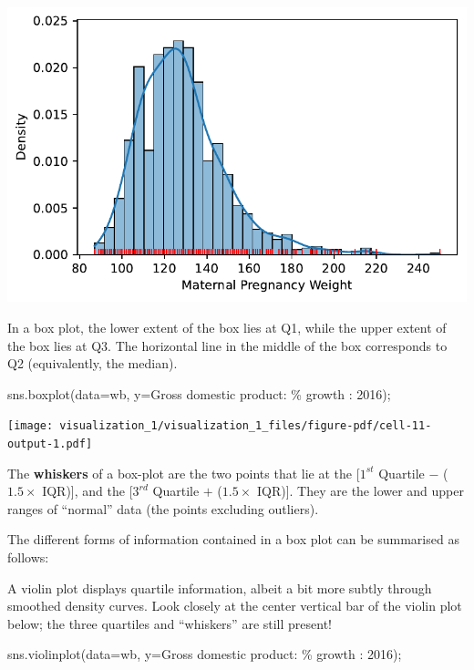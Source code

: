 \documentclass[
  letterpaper,
  DIV=11,
  numbers=noendperiod]{scrreprt}
\newenvironment{Shaded}{\begin{snugshade}}{\end{snugshade}}
\newcommand{\NormalTok}[1]{\textcolor[rgb]{0.00,0.23,0.31}{#1}}
\newcommand{\OperatorTok}[1]{\textcolor[rgb]{0.37,0.37,0.37}{#1}}
\newcommand{\SpecialCharTok}[1]{\textcolor[rgb]{0.37,0.37,0.37}{#1}}
\newcommand{\StringTok}[1]{\textcolor[rgb]{0.13,0.47,0.30}{#1}}
\begin{document}
\includegraphics{visualization_1/visualization_1_files/figure-pdf/cell-10-output-1.pdf}

In a box plot, the lower extent of the box lies at Q1, while the upper
extent of the box lies at Q3. The horizontal line in the middle of the
box corresponds to Q2 (equivalently, the median).

\begin{Shaded}
\begin{Highlighting}[]
\NormalTok{sns.boxplot(data}\OperatorTok{=}\NormalTok{wb, y}\OperatorTok{=}\StringTok{\textquotesingle{}Gross domestic product: }\SpecialCharTok{\% g}\StringTok{rowth : 2016\textquotesingle{}}\NormalTok{)}\OperatorTok{;}
\end{Highlighting}
\end{Shaded}

\texttt{[image: visualization\_1/visualization\_1\_files/figure-pdf/cell-11-output-1.pdf]}

The \textbf{whiskers} of a box-plot are the two points that lie at the
{[}\(1^{st}\) Quartile \(-\) (\(1.5\times\) IQR){]}, and the
{[}\(3^{rd}\) Quartile \(+\) (\(1.5\times\) IQR){]}. They are the lower
and upper ranges of ``normal'' data (the points excluding outliers).

The different forms of information contained in a box plot can be
summarised as follows:

A violin plot displays quartile information, albeit a bit more subtly
through smoothed density curves. Look closely at the center vertical bar
of the violin plot below; the three quartiles and ``whiskers'' are still
present!

\begin{Shaded}
\begin{Highlighting}[]
\NormalTok{sns.violinplot(data}\OperatorTok{=}\NormalTok{wb, y}\OperatorTok{=}\StringTok{\textquotesingle{}Gross domestic product: }\SpecialCharTok{\% g}\StringTok{rowth : 2016\textquotesingle{}}\NormalTok{)}\OperatorTok{;}
\end{Highlighting}
\end{Shaded}
\end{document}
